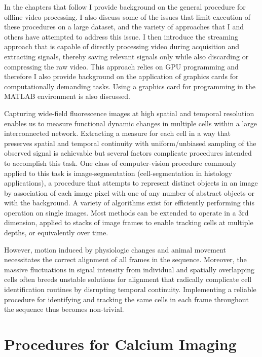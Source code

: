 \documentclass[
  12pt,
  lettersizepaper,
]{book}
\begin{document}
In the chapters that follow I provide background on the general
procedure for offline video processing. I also discuss some of the
issues that limit execution of these procedures on a large dataset, and
the variety of approaches that I and others have attempted to address
this issue. I then introduce the streaming approach that is capable of
directly processing video during acquisition and extracting signals,
thereby saving relevant signals only while also discarding or
compressing the raw video. This approach relies on GPU programming and
therefore I also provide background on the application of graphics cards
for computationally demanding tasks. Using a graphics card for
programming in the MATLAB environment is also discussed.

Capturing wide-field fluorescence images at high spatial and temporal
resolution enables us to measure functional dynamic changes in multiple
cells within a large interconnected network. Extracting a measure for
each cell in a way that preserves spatial and temporal continuity with
uniform/unbiased sampling of the observed signal is achievable but
several factors complicate procedures intended to accomplish this task.
One class of computer-vision procedure commonly applied to this task is
image-segmentation (cell-segmentation in histology applications), a
procedure that attempts to represent distinct objects in an image by
association of each image pixel with one of any number of abstract
objects or with the background. A variety of algorithms exist for
efficiently performing this operation on single images. Most methods can
be extended to operate in a 3rd dimension, applied to stacks of image
frames to enable tracking cells at multiple depths, or equivalently over
time.

However, motion induced by physiologic changes and animal movement
necessitates the correct alignment of all frames in the sequence.
Moreover, the massive fluctuations in signal intensity from individual
and spatially overlapping cells often breeds unstable solutions for
alignment that radically complicate cell identification routines by
disrupting temporal continuity. Implementing a reliable procedure for
identifying and tracking the same cells in each frame throughout the
sequence thus becomes non-trivial.

\hypertarget{sec:procedures-for-calcium-imaging}{%
\section{Procedures for Calcium
Imaging}\label{sec:procedures-for-calcium-imaging}}
\end{document}
